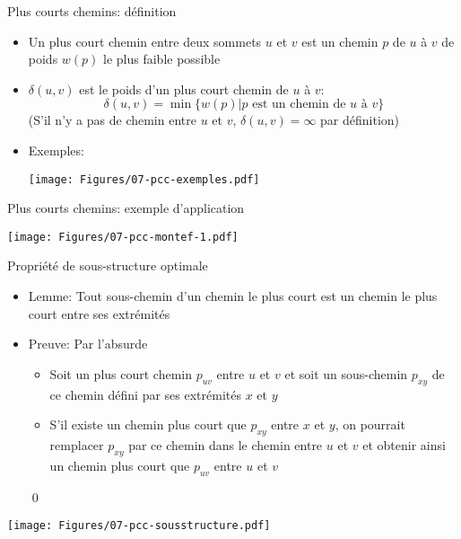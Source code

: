 \begin{frame}{Plus courts chemins: définition}

\begin{itemize}
\item Un \alert{plus court chemin} entre deux sommets $u$ et $v$ est un chemin
  $p$ de $u$ à $v$ de poids $w(p)$ le plus faible possible
\item $\delta(u,v)$ est le poids d'un plus court chemin de $u$ à $v$:
$$\delta(u,v)=\min\{w(p)|p \mbox{ est un chemin de }u\mbox{ à }v\}$$
(S'il n'y a pas de chemin entre $u$ et $v$, $\delta(u,v)=\infty$ par définition)
\item Exemples:

\bigskip

\centerline{\texttt{[image: Figures/07-pcc-exemples.pdf]}}


\end{itemize}


\end{frame}

\begin{frame}{Plus courts chemins: exemple d'application}

\centerline{\texttt{[image: Figures/07-pcc-montef-1.pdf]}}

\end{frame}

\begin{frame}{Propriété de sous-structure optimale}

\begin{itemize}
\item \alert{Lemme:} Tout sous-chemin d'un chemin le plus court est un chemin le plus court entre ses extrémités

\bigskip

\item \alert{Preuve:} Par l'absurde
\begin{itemize}
\item Soit un plus court chemin $p_{uv}$ entre $u$ et $v$ et soit un sous-chemin $p_{xy}$ de ce chemin défini par ses extrémités $x$ et $y$
\item S'il existe un chemin plus court que $p_{xy}$ entre $x$ et $y$, on pourrait remplacer $p_{xy}$ par ce chemin dans le chemin entre $u$ et $v$ et obtenir ainsi un chemin plus court que $p_{uv}$ entre $u$ et $v$
\end{itemize}\qed
\end{itemize}

\bigskip

\centerline{\texttt{[image: Figures/07-pcc-sousstructure.pdf]}}

\end{frame}


